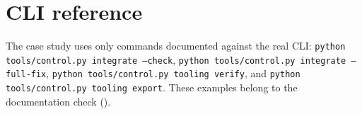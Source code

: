 \section{CLI reference}
\label{app:cli-reference}

The case study uses only commands documented against the real CLI:
\texttt{python tools/control.py integrate --check}, \texttt{python tools/control.py
integrate --full-fix}, \texttt{python tools/control.py tooling verify}, and
\texttt{python tools/control.py tooling export}. These examples belong to the
\Verified{} documentation check ().
